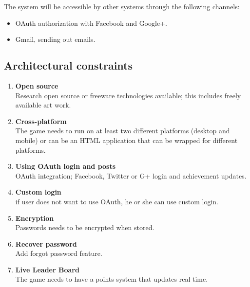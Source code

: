 \documentclass[letterpaper]{article}
\begin{document}
				The system will be accessible by other systems through the following channels:
				\begin{itemize}
					\item OAuth authorization with Facebook and Google+.
					\item Gmail, sending out emails.
				\end{itemize}
				
			\vspace{0.2in}
			\subsection*{ Architectural constraints }
			\vspace{0.1in}
					\vspace{0.1in}
		
			
				\begin{enumerate}
					\item \textbf{Open source}
					\\Research open source or freeware technologies available; this includes freely available art work.
					
					\item \textbf{Cross-platform}
					\\The game needs to run on at least two different platforms (desktop and mobile) or can be an HTML application that can be wrapped for different platforms.
					
					\item \textbf{Using OAuth login and posts}
					\\OAuth integration; Facebook, Twitter or G+ login and achievement updates.
					
					\item \textbf{Custom login}
					\\if user does not want to use OAuth, he or she can use custom login.
					
					\item \textbf{Encryption}
					\\Passwords needs to be encrypted when stored.
					
					\item \textbf{Recover password}
					\\Add forgot password feature.
									
					\item \textbf{Live Leader Board}
					\\The game needs to have a points system that updates real time.
					
					
				\end{enumerate}
			
\end{document}
